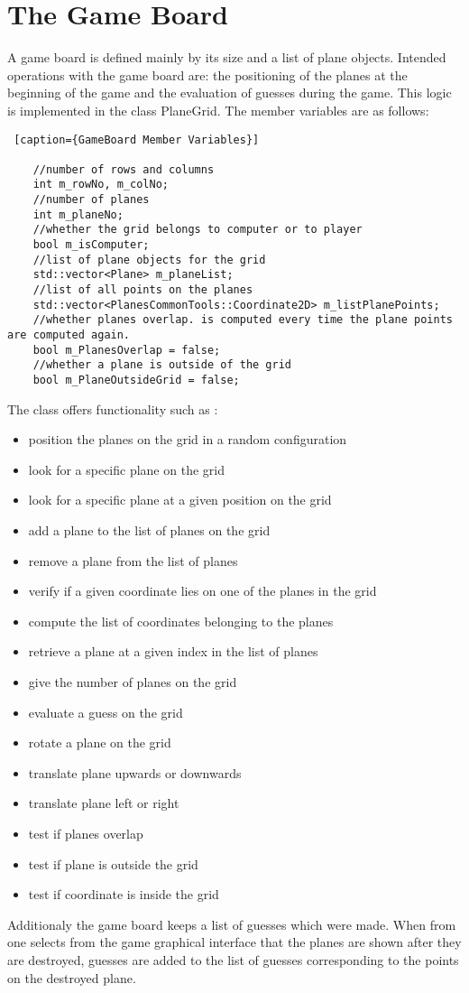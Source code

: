 \section{The Game Board} \label {Game_Board}

A game board is defined mainly by its size and a list of plane objects. Intended operations with the game board are: the positioning of the planes at the beginning of the game and the evaluation of guesses during the game. This logic is implemented in the class PlaneGrid. The member variables are as follows:

\begin{lstlisting} [caption={GameBoard Member Variables}]

	//number of rows and columns
	int m_rowNo, m_colNo;
	//number of planes
	int m_planeNo;
	//whether the grid belongs to computer or to player
	bool m_isComputer;
	//list of plane objects for the grid
	std::vector<Plane> m_planeList;
	//list of all points on the planes
	std::vector<PlanesCommonTools::Coordinate2D> m_listPlanePoints;
	//whether planes overlap. is computed every time the plane points are computed again.
	bool m_PlanesOverlap = false;
	//whether a plane is outside of the grid
	bool m_PlaneOutsideGrid = false;

\end{lstlisting}

The class offers functionality such as :
\begin{itemize}
	\item position the planes on the grid in a random configuration
	\item look for a specific plane on the grid
	\item look for a specific plane at a given position on the grid
	\item add a plane to the list of planes on the grid
	\item remove a plane from the list of planes
	\item verify if a given coordinate lies on one of the planes in the grid
	\item compute the list of coordinates belonging to the planes
	\item retrieve a plane at a given index in the list of planes
	\item give the number of planes on the grid
	\item evaluate a guess on the grid
	\item rotate a plane on the grid
	\item translate plane upwards or downwards
	\item translate plane left or right
	\item test if planes overlap
	\item test if plane is outside the grid
	\item test if coordinate is inside the grid

\end{itemize}

Additionaly the game board keeps a list of guesses which were made. When from one selects  from the game graphical interface that the planes are shown after they are destroyed, guesses are added to the list of guesses corresponding to the points on the destroyed plane.